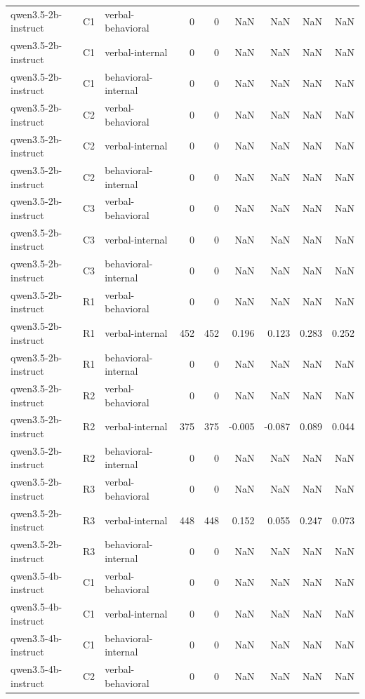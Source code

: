 \begin{table}
\begin{tabular}{lllrrrrrr}
qwen3.5-2b-instruct & C1 & verbal-behavioral & 0 & 0 & NaN & NaN & NaN & NaN \\
qwen3.5-2b-instruct & C1 & verbal-internal & 0 & 0 & NaN & NaN & NaN & NaN \\
qwen3.5-2b-instruct & C1 & behavioral-internal & 0 & 0 & NaN & NaN & NaN & NaN \\
qwen3.5-2b-instruct & C2 & verbal-behavioral & 0 & 0 & NaN & NaN & NaN & NaN \\
qwen3.5-2b-instruct & C2 & verbal-internal & 0 & 0 & NaN & NaN & NaN & NaN \\
qwen3.5-2b-instruct & C2 & behavioral-internal & 0 & 0 & NaN & NaN & NaN & NaN \\
qwen3.5-2b-instruct & C3 & verbal-behavioral & 0 & 0 & NaN & NaN & NaN & NaN \\
qwen3.5-2b-instruct & C3 & verbal-internal & 0 & 0 & NaN & NaN & NaN & NaN \\
qwen3.5-2b-instruct & C3 & behavioral-internal & 0 & 0 & NaN & NaN & NaN & NaN \\
qwen3.5-2b-instruct & R1 & verbal-behavioral & 0 & 0 & NaN & NaN & NaN & NaN \\
qwen3.5-2b-instruct & R1 & verbal-internal & 452 & 452 & 0.196 & 0.123 & 0.283 & 0.252 \\
qwen3.5-2b-instruct & R1 & behavioral-internal & 0 & 0 & NaN & NaN & NaN & NaN \\
qwen3.5-2b-instruct & R2 & verbal-behavioral & 0 & 0 & NaN & NaN & NaN & NaN \\
qwen3.5-2b-instruct & R2 & verbal-internal & 375 & 375 & -0.005 & -0.087 & 0.089 & 0.044 \\
qwen3.5-2b-instruct & R2 & behavioral-internal & 0 & 0 & NaN & NaN & NaN & NaN \\
qwen3.5-2b-instruct & R3 & verbal-behavioral & 0 & 0 & NaN & NaN & NaN & NaN \\
qwen3.5-2b-instruct & R3 & verbal-internal & 448 & 448 & 0.152 & 0.055 & 0.247 & 0.073 \\
qwen3.5-2b-instruct & R3 & behavioral-internal & 0 & 0 & NaN & NaN & NaN & NaN \\
qwen3.5-4b-instruct & C1 & verbal-behavioral & 0 & 0 & NaN & NaN & NaN & NaN \\
qwen3.5-4b-instruct & C1 & verbal-internal & 0 & 0 & NaN & NaN & NaN & NaN \\
qwen3.5-4b-instruct & C1 & behavioral-internal & 0 & 0 & NaN & NaN & NaN & NaN \\
qwen3.5-4b-instruct & C2 & verbal-behavioral & 0 & 0 & NaN & NaN & NaN & NaN \\

\end{tabular}
\end{table}
